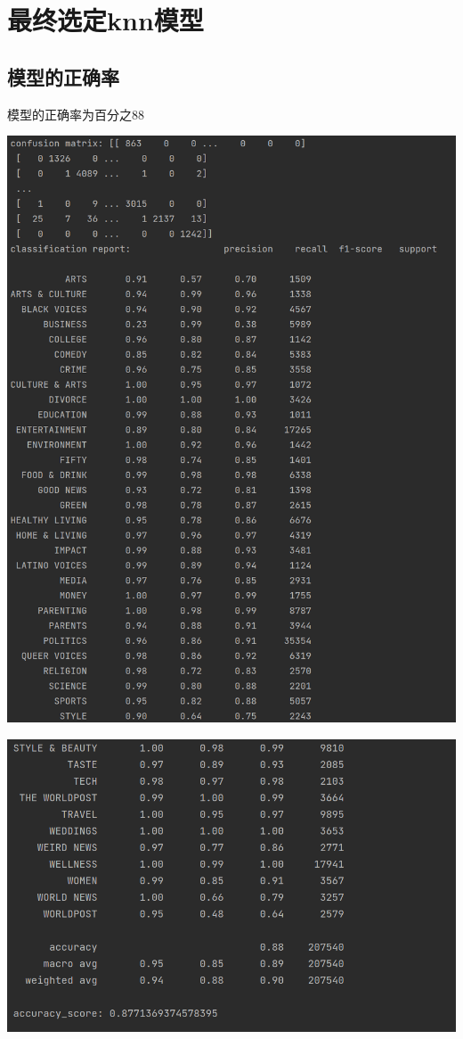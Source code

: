 \documentclass{article}
\begin{document}
\section{最终选定knn模型}
\subsection{模型的正确率}
模型的正确率为百分之88
\begin{center}
    \includegraphics[width=1\linewidth]{5.png}
\end{center}
\begin{center}
    \includegraphics[width=1\linewidth]{6.png}
\end{center}
\end{document}
